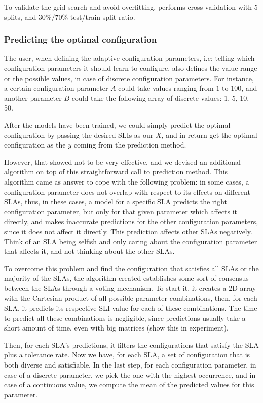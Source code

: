 To validate the grid search and avoid overfitting, \projectname{} performs cross-validation with 5 splits, and $30\%\slash70\%$ test/train split ratio.

\subsubsection{Predicting the optimal configuration}

The user, when defining the adaptive configuration parameters, i.e: telling \projectname{} which configuration parameters it should learn to configure, also defines the value range or the possible values, in case of discrete configuration parameters. For instance, a certain configuration parameter $A$ could take values ranging from $1$ to $100$, and another parameter $B$ could take the following array of discrete values: 1, 5, 10, 50.

After the models have been trained, we could simply predict the optimal configuration by passing the desired SLIs as our $X$, and in return get the optimal configuration as the $y$ coming from the prediction method.

However, that showed not to be very effective, and we devised an additional algorithm on top of this straightforward call to prediction method. This algorithm came as answer to cope with the following problem: in some cases, a configuration parameter does not overlap with respect to its effects on different SLAs, thus, in these cases, a model for a specific SLA predicts the right configuration parameter, but only for that given parameter which affects it directly, and makes inaccurate predictions for the other configuration parameters, since it does not affect it directly. This prediction affects other SLAs negatively. Think of an SLA being selfish and only caring about the configuration parameter that affects it, and not thinking about the other SLAs.

To overcome this problem and find the configuration that satisfies all SLAs or the majority of the SLAs, the algorithm created establishes some sort of consensus between the SLAs through a voting mechanism. To start it, it creates a 2D array with the Cartesian product of all possible parameter combinations, then, for each SLA, it predicts its respective SLI value for each of these combinations. The time to predict all these combinations is negligible, since predictions usually take a short amount of time, even with big matrices (show this in experiment).

Then, for each SLA's predictions, it filters the configurations that satisfy the SLA plus a tolerance rate. Now we have, for each SLA, a set of configuration that is both diverse and satisfiable. In the last step, for each configuration parameter, in case of a discrete parameter, we pick the one with the highest occurrence, and in case of a continuous value, we compute the mean of the predicted values for this parameter.


